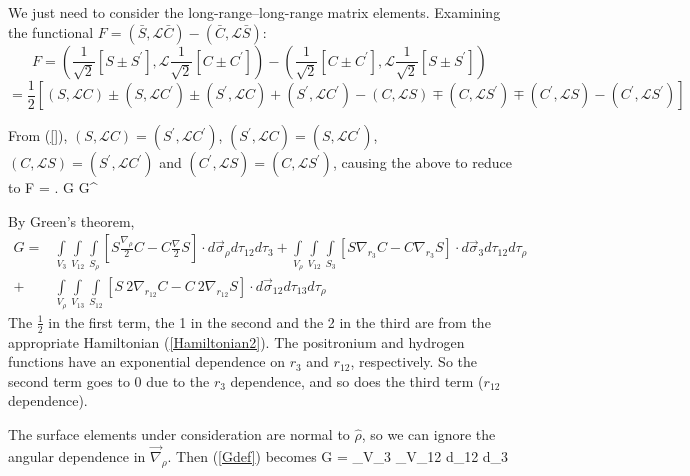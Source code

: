 \documentclass[Dissertation.tex]{subfiles}
\begin{document}
We just need to consider the long-range--long-range matrix elements. Examining the functional
 $F = \left(\bar{S}, \mathcal{L}\bar{C}\right) - \left(\bar{C}, \mathcal{L}\bar{S}\right)$:
\begin{equation*}
F = \left(\frac{1}{\sqrt{2}} \left[S \pm S^\prime \right], \mathcal{L} \frac{1}{\sqrt{2}}\left[C \pm C^\prime \right] \right) -
    \left(\frac{1}{\sqrt{2}} \left[C \pm C^\prime \right], \mathcal{L} \frac{1}{\sqrt{2}}\left[S \pm S^\prime \right] \right)
\end{equation*}
\begin{equation}
= \frac{1}{2}\left[(S,\mathcal{L}C) \pm (S,\mathcal{L}C^\prime) \pm (S^\prime,\mathcal{L}C) + (S^\prime,\mathcal{L}C^\prime) - (C,\mathcal{L}S) \mp (C,\mathcal{L}S^\prime) \mp (C^\prime,\mathcal{L}S) - (C^\prime,\mathcal{L}S^\prime)\right]
\end{equation}

From (\ref{}), $(S,\mathcal{L}C) = (S^\prime,\mathcal{L}C^\prime)$, $(S^\prime,\mathcal{L}C) = (S,\mathcal{L}C^\prime)$, $(C,\mathcal{L}S) = (S^\prime,\mathcal{L}C^\prime)$ and $(C^\prime,\mathcal{L}S) = (C,\mathcal{L}S^\prime)$, causing the above to reduce to
\beqs
F =  \pm {}.
\eeqs
\beq
\equiv G \pm G^\prime
\label{GBarDef}
\eeq

By Green's theorem,
\begin{align}
\nonumber
G = &\int\limits_{V_3} \int\limits_{V_{12}} \int\limits_{S_\rho} \left[ S \frac{\nabla_\rho}{2} C - C \frac{\nabla}{2} S\right] \cdot d\vec{\sigma}_\rho d\tau_{12} d\tau_3
  + \int\limits_{V_\rho} \int\limits_{V_{12}} \int\limits_{S_3} \left[ S \nabla_{r_3} C - C \nabla_{r_3} S\right] \cdot d\vec{\sigma}_3 d\tau_{12} d\tau_{\rho} \\
  + &\int\limits_{V_\rho} \int\limits_{V_{13}}\int\limits_{S_{12}} \left[ S \: 2 \nabla_{r_{12}} C - C \: 2 \nabla_{r_{12}} S\right] \cdot d\vec{\sigma}_{12} d\tau_{13} d\tau_\rho
  \label{GDef}
\end{align}
The $\frac{1}{2}$ in the first term, the 1 in the second and the 2 in the third are from the appropriate Hamiltonian (\ref{Hamiltonian2}).
The positronium and hydrogen functions have an exponential dependence on $r_3$ and $r_{12}$, respectively.  So the second term goes to 0 due to the $r_3$ dependence, and so does the third term ($r_{12}$ dependence).

The surface elements under consideration are normal to $\hat{\rho}$, so we can ignore the angular dependence in $\vec{\nabla}_\rho$.  Then (\ref{Gdef}) becomes
\beq
G =  \int\limits_{V_3} \int\limits_{V_{12}}  d\tau_{12} d\tau_3
\label{GDef2}
\eeq
\end{document}
